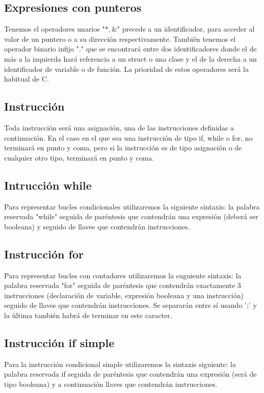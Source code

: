 \documentclass{article}
\begin{document}
\subsection{Expresiones con punteros}

Tenemos el operadores unarios "$*,\&$" precede a un identificador, para acceder al valor de un puntero o a su dirección respectivamente.
También tenemos el operador binario infijo "." que se encontrará entre dos identificadores donde el de más a la izquierda hará referencia a un struct o una clase y el de la derecha a un identificador de variable o de función. La prioridad de estos operadores será la habitual de C.


\subsection{Instrucción}
Toda instrucción será una asignación, una de las instrucciones definidas a continuación. En el caso en el que sea una instrucción de tipo if, while o for, no terminará en punto y coma, pero si la instrucción es de tipo asignación o de cualquier otro tipo, terminará en punto y coma.


\subsection{Intrucción while}

Para representar bucles condicionales utilizaremos la siguiente sintaxis: la palabra reservada "while" seguida de paréntesis que contendrán una expresión (deberá ser booleana) y seguido de llaves que contendrán instrucciones.

\subsection{Instrucción for}

Para representar bucles con contadores utilizaremos la suguiente sintaxis: la palabra reservada "for" seguida de paréntesis que contendrán exactamente 3 instrucciones (declaración de variable, expresión booleana y una instrucción) seguido de llaves que contendrán instrucciones. Se separarán entre sí usando ';' y la última también habrá de terminar en este caracter.

\subsection{Instrucción if simple}

Para la instrucción condicional simple utilizaremos la sintaxis siguiente: la palabra reservada if seguida de paréntesis que contendrán una expresión (será de tipo booleana) y a continuación llaves que contendrán instrucciones.
\end{document}

